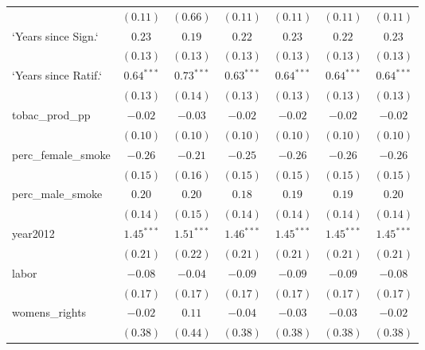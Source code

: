 \begin{table}[!h]
\begin{center}
\begin{tabular}{l c c c c c c }
                        & $(0.11)$     & $(0.66)$     & $(0.11)$     & $(0.11)$     & $(0.11)$     & $(0.11)$     \\
`Years since Sign.`     & $0.23$       & $0.19$       & $0.22$       & $0.23$       & $0.22$       & $0.23$       \\
                        & $(0.13)$     & $(0.13)$     & $(0.13)$     & $(0.13)$     & $(0.13)$     & $(0.13)$     \\
`Years since Ratif.`    & $0.64^{***}$ & $0.73^{***}$ & $0.63^{***}$ & $0.64^{***}$ & $0.64^{***}$ & $0.64^{***}$ \\
                        & $(0.13)$     & $(0.14)$     & $(0.13)$     & $(0.13)$     & $(0.13)$     & $(0.13)$     \\
tobac\_prod\_pp         & $-0.02$      & $-0.03$      & $-0.02$      & $-0.02$      & $-0.02$      & $-0.02$      \\
                        & $(0.10)$     & $(0.10)$     & $(0.10)$     & $(0.10)$     & $(0.10)$     & $(0.10)$     \\
perc\_female\_smoke     & $-0.26$      & $-0.21$      & $-0.25$      & $-0.26$      & $-0.26$      & $-0.26$      \\
                        & $(0.15)$     & $(0.16)$     & $(0.15)$     & $(0.15)$     & $(0.15)$     & $(0.15)$     \\
perc\_male\_smoke       & $0.20$       & $0.20$       & $0.18$       & $0.19$       & $0.19$       & $0.20$       \\
                        & $(0.14)$     & $(0.15)$     & $(0.14)$     & $(0.14)$     & $(0.14)$     & $(0.14)$     \\
year2012                & $1.45^{***}$ & $1.51^{***}$ & $1.46^{***}$ & $1.45^{***}$ & $1.45^{***}$ & $1.45^{***}$ \\
                        & $(0.21)$     & $(0.22)$     & $(0.21)$     & $(0.21)$     & $(0.21)$     & $(0.21)$     \\
labor                   & $-0.08$      & $-0.04$      & $-0.09$      & $-0.09$      & $-0.09$      & $-0.08$      \\
                        & $(0.17)$     & $(0.17)$     & $(0.17)$     & $(0.17)$     & $(0.17)$     & $(0.17)$     \\
womens\_rights          & $-0.02$      & $0.11$       & $-0.04$      & $-0.03$      & $-0.03$      & $-0.02$      \\
                        & $(0.38)$     & $(0.44)$     & $(0.38)$     & $(0.38)$     & $(0.38)$     & $(0.38)$     \\

\end{tabular}
\end{center}
\end{table}

